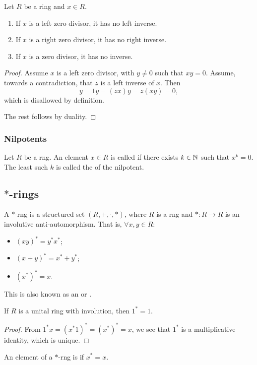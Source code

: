 \begin{lemma} \label{inverseZeroDivisor}
Let $R$ be a ring and $x\in R$.
\begin{enumerate}
\item If $x$ is a left zero divisor, it has no left inverse.
\item If $x$ is a right zero divisor, it has no right inverse.
\item If $x$ is a zero divisor, it has no inverse.
\end{enumerate}
\end{lemma}
\begin{proof}
Assume $x$ is a left zero divisor, with $y\neq 0$ such that $xy = 0$. Assume, towards a contradiction, that $z$ is a left inverse of $x$. Then
\[ y = 1y = (zx)y = z(xy) = 0, \]
which is disallowed by definition.

The rest follows by duality.
\end{proof}

\subsubsection{Nilpotents}
\begin{definition}
Let $R$ be a rng. An element $x\in R$ is called  if there exists $k\in \mathbb{N}$ such that $x^k = 0$. The least such $k$ is called the  of the nilpotent.
\end{definition}

\subsection{$*$-rings}
\begin{definition}
A $*$-rng is a structured set $(R,+,\cdot, *)$, where $R$ is a rng and $*:R\to R$ is an involutive anti-automorphism. That is, $\forall x,y\in R$:
\begin{itemize}
\item $(xy)^* = y^*x^*$;
\item $(x+y)^* = x^* + y^*$;
\item $(x^*)^* = x$.
\end{itemize}
This is also known as an  or .
\end{definition}
\begin{lemma}
If $R$ is a unital ring with involution, then $1^* = 1$.
\end{lemma}
\begin{proof}
From $1^*x = (x^*1)^* = (x^*)^* = x$, we see that $1^*$ is a multiplicative identity, which is unique.
\end{proof}
\begin{definition}
An element of a $*$-rng is  if $x^* = x$.
\end{definition}

